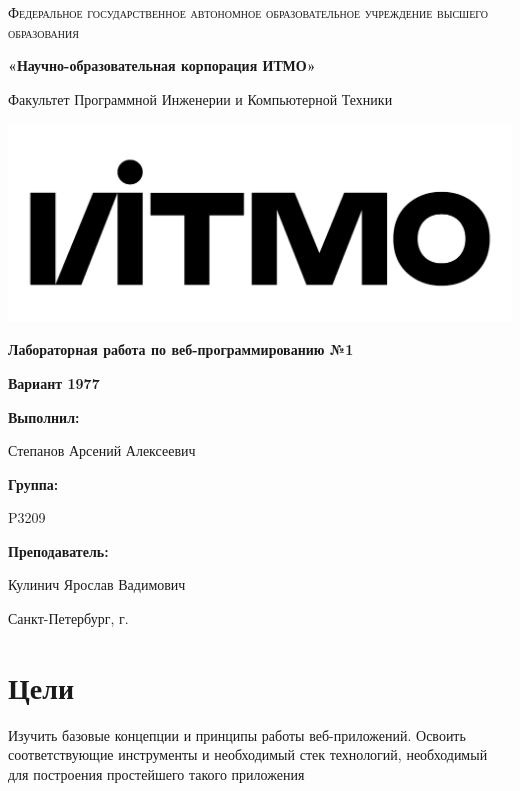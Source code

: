 \documentclass[12pt,a4paper]{report}
\begin{document}
\begin{titlepage} 
	\centering
	{
        \scshape
        Федеральное государственное автономное образовательное учреждение высшего образования
        \par
        \textbf{«Научно-образовательная корпорация ИТМО»}
        \par
        \vspace*{1cm}
        Факультет Программной Инженерии и Компьютерной Техники
        \par
    }
    \vspace*{0.6cm}
    \includegraphics[width=\textwidth]{logo.png}
    {
        \Large
        \textbf{Лабораторная работа по веб-программированию №1}
        \par
        \normalsize
        \vspace*{0.75cm}
        \textbf{Вариант 1977}
        \par
    }
    \vfill
    \hfill\begin{minipage}{\dimexpr\textwidth-7.8cm}
        \textbf{Выполнил:}\par
        Степанов Арсений Алексеевич\par
        \vspace*{0.15cm}
        \textbf{Группа:}\par
        P3209\par
        \vspace*{0.15cm}
        \textbf{Преподаватель:}\par
        Кулинич Ярослав Вадимович\par
    \end{minipage}
    \vfill
    Санкт-Петербург, \the\year{}г.
\end{titlepage}  
\section*{Цели}
Изучить базовые концепции и принципы работы веб-приложений. Освоить соответствующие инструменты и необходимый стек технологий, необходимый для построения простейшего такого приложения
\end{document}
